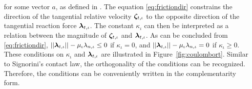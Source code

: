 \documentclass[../DC2017114Bouma.tex]{subfiles}
\begin{document}
for some vector $a$, as defined in \cite{Studer2006}. The equation \eqref{eq:frictiondir} constrains the direction of the tangential relative velocity $\boldsymbol{\zeta}_{t,\iota}$ to the opposite direction of the tangential reaction force $\boldsymbol{\lambda}_{t,\iota}$. The constant $\kappa_{\iota}$ can then be interpreted as a relation between the magnitude of $\boldsymbol{\zeta}_{t,\iota}$ and $\boldsymbol{\lambda}_{t,\iota}$. As can be concluded from \eqref{eq:frictiondir}, $||\boldsymbol{\lambda}_{t,\iota}||-\mu_{\iota}\lambda_{n,\iota}\leq 0$ if $\kappa_{\iota} = 0$, and $||\boldsymbol{\lambda}_{t,\iota}||-\mu_{\iota}\lambda_{n,\iota} = 0$ if $\kappa_{\iota} \geq 0$. These conditions on $\kappa_{\iota}$ and $\boldsymbol{\lambda}_{t,\iota}$ are illustrated in Figure~\ref{fig:coulombort}. Similar to Signorini's contact law, the orthogonality of the conditions can be recognized. Therefore, the conditions can be conveniently written in the complementarity form.
\end{document}
